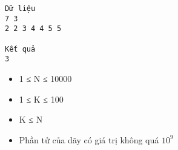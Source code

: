 \begin{verbatim}
Dữ liệu
7 3
2 2 3 4 4 5 5

Kết quả
3
\end{verbatim}
\begin{itemize}
	\item     1 ≤ N ≤ 10000   
	\item     1 ≤ K ≤ 100   
	\item     K ≤ N   
	\item     Phần tử của dãy có giá trị không quá $10^{9}$
\end{itemize}